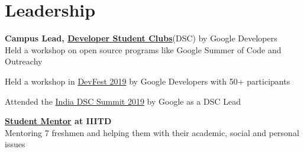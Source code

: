 \documentclass[]{deedy-resume-reversed}
\begin{document}
\begin{minipage}[t]{0.33\textwidth}
\section{Leadership}

\textbf{Campus Lead, \href{https://developers.google.com/community/dsc/clubs}{Developer Student Clubs}}(DSC) by Google Developers\\
\textbullet{} Held a workshop on open source programs like Google Summer of Code and Outreachy 

\textbullet{} Held a workshop in \href{https://www.meetup.com/GDGNewDelhi/events/264423582/}{DevFest 2019} by Google Developers with 50+ participants

\textbullet{} Attended the \href{https://www.youtube.com/watch?v=5HStQYsx5FE}{India DSC Summit 2019} by Google as a DSC Lead

\textbf{\href{https://www.iiitd.edu.in/smp/team.html}{Student Mentor} at IIITD} \\
\textbullet{} Mentoring 7 freshmen and helping them with their academic, social and personal issues\\
\sectionsep


\end{minipage}
\end{document}
